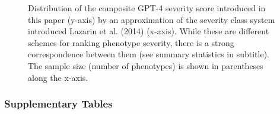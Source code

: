 \documentclass[
]{agujournal2019}
\begin{document}
\label{cell-fig-severity-class}
\begin{figure}[H]


\caption{\label{fig-severity-class}Distribution of the composite GPT-4
severity score introduced in this paper (y-axis) by an approximation of
the severity class system introduced Lazarin et al. (2014) (x-axis).
While these are different schemes for ranking phenotype severity, there
is a strong correspondence between them (see summary statistics in
subtitle). The sample size (number of phenotypes) is shown in
parentheses along the x-axis.}

\end{figure}%

\newpage{}

\subsubsection{Supplementary Tables}\label{supplementary-tables}
\end{document}
